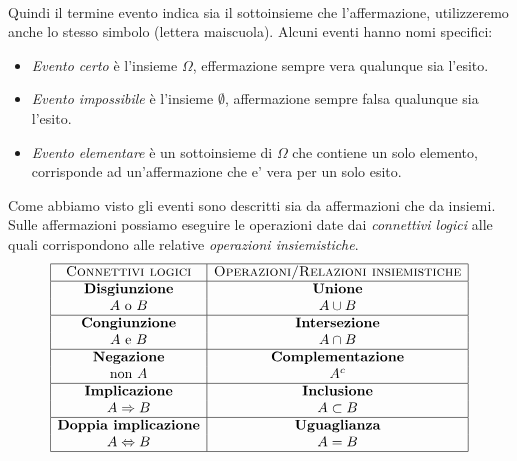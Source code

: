 \documentclass[a4paper,12pt]{article}
\begin{document}
\vspace{5px}\\
Quindi il termine evento indica sia il sottoinsieme che l'affermazione, utilizzeremo anche lo stesso simbolo (lettera maiscuola).
Alcuni eventi hanno nomi specifici:
\begin{itemize}
  \item \textit{Evento certo} è l'insieme $\Omega$, effermazione sempre vera qualunque sia l'esito.
  \item \textit{Evento impossibile} è l'insieme $\emptyset$, affermazione sempre falsa qualunque sia l'esito.
  \item \textit{Evento elementare} è un sottoinsieme di $\Omega$ che contiene un solo elemento, corrisponde ad un’affermazione che e' vera per un solo esito.
\end{itemize}
Come abbiamo visto gli eventi sono descritti sia da affermazioni che da insiemi. Sulle affermazioni possiamo eseguire le operazioni date dai \textit{connettivi logici} alle quali corrispondono alle relative \textit{operazioni insiemistiche}.
\[
\begin{array}{|c|c|}
\hline
\textsc{Connettivi logici} & \textsc{Operazioni/Relazioni insiemistiche} \\
\hline

\textbf{Disgiunzione} & \textbf{Unione} \\
A \ \text{o} \ B & A \cup B \\
\hline

\textbf{Congiunzione} & \textbf{Intersezione} \\
A \ \text{e} \ B & A \cap B \\
\hline

\textbf{Negazione} & \textbf{Complementazione} \\
\text{non } A & A^{c} \\
\hline

\textbf{Implicazione} & \textbf{Inclusione} \\
A \Rightarrow B & A \subset B \\
\hline

\textbf{Doppia implicazione} & \textbf{Uguaglianza} \\
A \Leftrightarrow B & A = B \\
\hline

\end{array}
\]
\end{document}
